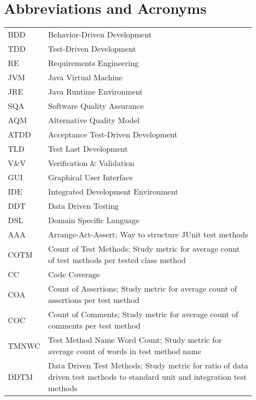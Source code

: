 \chapter*{Abbreviations and Acronyms}


\noindent
\begin{longtable}{@{}p{}p{}@{}}
BDD & Behavior-Driven Development \\
TDD & Test-Driven Development \\
RE & Requirements Engineering \\
JVM & Java Virtual Machine \\
JRE & Java Runtime Environment \\
SQA & Software Quality Assurance \\
AQM & Alternative Quality Model \\
ATDD & Acceptance Test-Driven Development \\
TLD & Test Last Development \\
V\&V & Verification \& Validation \\
GUI & Graphical User Interface \\
IDE & Integrated Development Environment \\
DDT & Data Driven Testing \\
DSL & Domain Specific Language \\
AAA & Arrange-Act-Assert; Way to structure JUnit test methods \\
COTM & Count of Test Methods; Study metric for average count of test methods per tested class method \\
CC & Code Coverage \\
COA & Count of Assertions; Study metric for average count of assertions per test method \\
COC & Count of Comments; Study metric for average count of comments per test method \\
TMNWC & Test Method Name Word Count; Study metric for average count of words in test method name \\
DDTM & Data Driven Test Methods; Study metric for ratio of data driven test methods to standard unit and integration test methods \\
\end{longtable}
